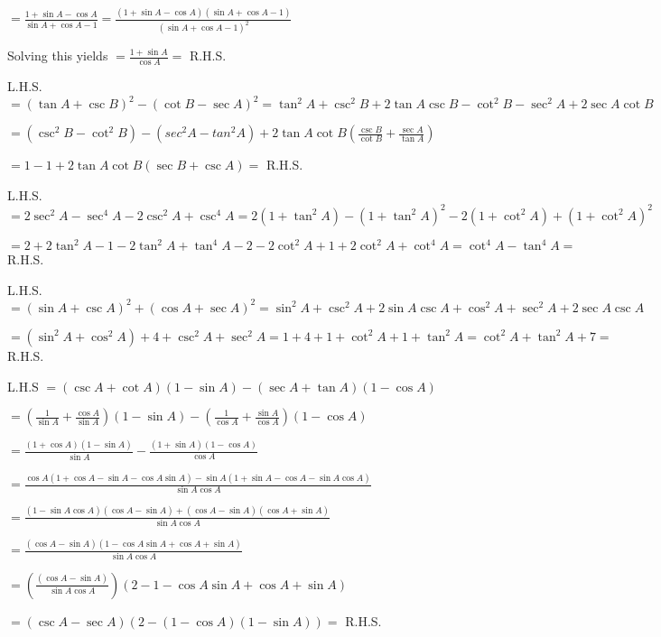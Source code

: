     $= \frac{1 + \sin A - \cos A}{\sin A + \cos A - 1} = \frac{(1 + \sin A - \cos A)(\sin A + \cos A - 1)}{(\sin A + \cos A -
    1)^2}$

    Solving this yields $= \frac{1 + \sin A}{\cos A} =$ R.H.S.

\item L.H.S. $= (\tan A + \csc B)^2 - (\cot B - \sec A)^2 = \tan^2A + \csc^2B + 2\tan A\csc B - \cot^2B - \sec^2A+ 2\sec
    A\cot B$


    $= (\csc^2B - \cot^2B) - (sec^2A - tan^2A) + 2\tan A\cot B\left(\frac{\csc B}{\cot B} + \frac{\sec A}{\tan A}\right)$

    $= 1 - 1 + 2\tan A\cot B\left(\sec B + \csc A\right)  =$ R.H.S.

\item L.H.S. $= 2\sec^2 A - \sec^4A - 2\csc^2A + \csc^4A = 2(1 + \tan^2A) - (1 + \tan^2A)^2 - 2(1 + \cot^2A) + (1 +
    \cot^2A)^2$

    $= 2 + 2\tan^2A - 1 - 2\tan^2A + \tan^4A - 2 - 2\cot^2A + 1 + 2\cot^2A + \cot^4A = \cot^4A - \tan^4A =$ R.H.S.

\item L.H.S. $= (\sin A + \csc A)^2 + (\cos A + \sec A)^2 = \sin^2A + \csc^2A + 2\sin A\csc A + \cos^2A + \sec^2A + 2\sec
    A\csc A$

    $= (\sin^2A + \cos^2A) + 4 + \csc^2A + \sec^2A = 1 + 4 + 1 + \cot^2A + 1 + \tan^2A = \cot^2A + \tan^2A + 7 =$ R.H.S.

\item L.H.S $= (\csc A + \cot A)(1 - \sin A) - (\sec A + \tan A)(1 - \cos A)$

    $= \left(\frac{1}{\sin A} + \frac{\cos A}{\sin A}\right)(1 - \sin A) - \left(\frac{1}{\cos A} + \frac{\sin A}{\cos
    A}\right)(1 - \cos A)$

    $= \frac{(1 + \cos A)(1 - \sin A)}{\sin A} - \frac{(1 + \sin A)(1 - \cos A)}{\cos A}$

    $= \frac{\cos A(1 + \cos A - \sin A - \cos A\sin A) -\sin A(1 + \sin A - \cos A - \sin A\cos A)}{\sin A\cos A}$

    $= \frac{(1 - \sin A\cos A)(\cos A - \sin A) + (\cos A - \sin A)(\cos A + \sin A)}{\sin A\cos A}$

    $= \frac{(\cos A - \sin A)(1 - \cos A\sin A + \cos A + \sin A)}{\sin A\cos A}$

    $= \left(\frac{(\cos A - \sin A)}{\sin A\cos A}\right)(2 - 1 - \cos A\sin A + \cos A + \sin A)$

    $= (\csc A - \sec A)(2 - (1 - \cos A)(1 - \sin A)) =$ R.H.S.

